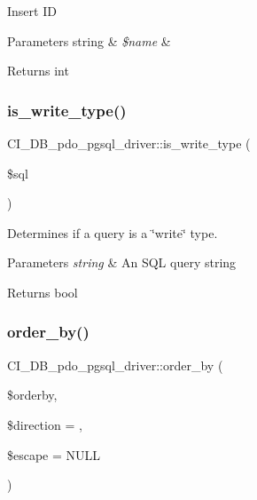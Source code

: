 Insert ID


\begin{DoxyParams}[1]{Parameters}
string & {\em \$name} & \\
\hline
\end{DoxyParams}
\begin{DoxyReturn}{Returns}
int 
\end{DoxyReturn}
\mbox{\label{class_c_i___d_b__pdo__pgsql__driver_a7789b0242b9d9a2f99c4146bb31e5ce9}} 
\subsubsection{\texorpdfstring{is\+\_\+write\+\_\+type()}{is\_write\_type()}}
{\footnotesize\ttfamily C\+I\+\_\+\+D\+B\+\_\+pdo\+\_\+pgsql\+\_\+driver\+::is\+\_\+write\+\_\+type (\begin{DoxyParamCaption}\item[{}]{\$sql }\end{DoxyParamCaption})}

Determines if a query is a \char`\"{}write\char`\"{} type.


\begin{DoxyParams}{Parameters}
{\em string} & An S\+QL query string \\
\hline
\end{DoxyParams}
\begin{DoxyReturn}{Returns}
bool 
\end{DoxyReturn}
\mbox{\label{class_c_i___d_b__pdo__pgsql__driver_ad72dcece147716162fadaae0e822b61f}} 
\subsubsection{\texorpdfstring{order\+\_\+by()}{order\_by()}}
{\footnotesize\ttfamily C\+I\+\_\+\+D\+B\+\_\+pdo\+\_\+pgsql\+\_\+driver\+::order\+\_\+by (\begin{DoxyParamCaption}\item[{}]{\$orderby,  }\item[{}]{\$direction = {\ttfamily \textquotesingle{}\textquotesingle{}},  }\item[{}]{\$escape = {\ttfamily NULL} }\end{DoxyParamCaption})}

